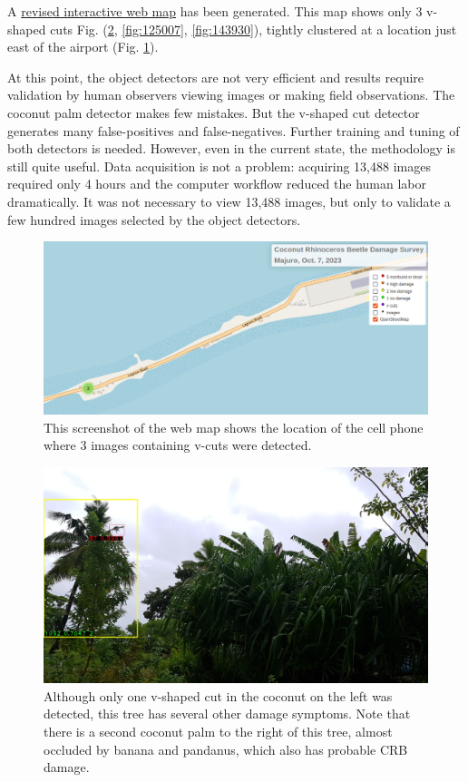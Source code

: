 \documentclass[12pt,letterpaper,english,bibliography=totocnumbered, abstract=on]{scrartcl}
\begin{document}
A \href{https://aubreymoore.github.io/Majuro-CRB-damage-map-1/webmap/#12/7.1082/171.2072}{revised interactive web map} has been generated. This map shows only 3 v-shaped cuts Fig. (\ref{fig:125004}, \ref{fig:125007}, \ref{fig:143930}), tightly clustered at a location just east of the airport (Fig. \ref{fig:v-cuts-location}).

At this point, the object detectors are not very efficient and results require validation by human observers viewing images or making field observations. The coconut palm detector makes few mistakes. But the v-shaped cut detector generates many false-positives and false-negatives. Further training and tuning of both detectors is needed. However, even in the current state, the methodology is still quite useful. Data acquisition is not a problem: acquiring 13,488 images required only 4 hours and the computer workflow reduced the human labor dramatically. It was not necessary to view 13,488 images, but only to validate a few hundred images selected by the object detectors. 

\begin{figure}
	\centering
	\includegraphics[width=\linewidth]{images/v-cuts-location}
	\caption{This screenshot of the web map shows the location of the cell phone  where 3 images containing v-cuts were detected.}
	\label{fig:v-cuts-location}
\end{figure}

\begin{figure}
	\centering
	\includegraphics[width=\linewidth]{images/IMG_20231007_125004}
	\caption{Although only one v-shaped cut in the coconut on the left was detected, this tree has several other damage symptoms. Note that there is a second coconut palm to the right of this tree, almost occluded by banana and pandanus, which also has probable CRB damage.}
	\label{fig:125004}
\end{figure}
\end{document}
